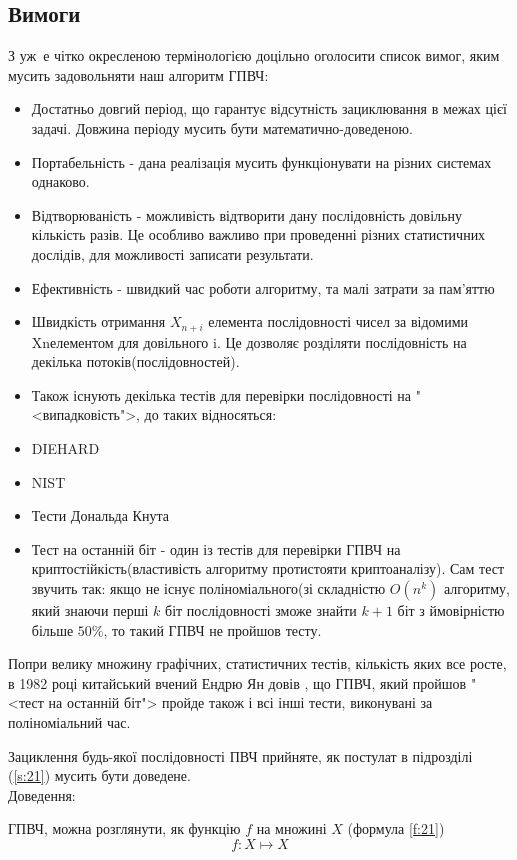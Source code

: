 \documentclass[oneside,final,14pt]{extreport}
\begin{document}
\begin{large}
\section{Вимоги}\label{s:22}
З уж~е чітко окресленою термінологією доцільно оголосити 
список вимог, яким мусить задовольняти наш алгоритм ГПВЧ:
\begin{itemize}
	\item 
Достатньо довгий період, що гарантує відсутність зациклювання 
в межах цієї задачі. Довжина періоду мусить бути математично-доведеною.
	\item 
Портабельність - дана реалізація мусить функціонувати на різних 
системах однаково.
	\item 
Відтворюваність - можливість відтворити дану послідовність 
довільну кількість разів. Це особливо важливо при проведенні 
різних статистичних дослідів, для можливості записати результати.
	\item 
Ефективність - швидкий час роботи алгоритму, та малі затрати 
за пам'яттю
	\item 
Швидкість отримання \(X_{n+i}\) елемента послідовності чисел за відомими 
Xnелементом для довільного i. Це дозволяє розділяти послідовність 
на декілька потоків(послідовностей).
	\item 
Також існують декілька тестів для перевірки послідовності на 
"<випадковість">, до таких відносяться:
	\item 
DIEHARD
	\item 
NIST
	\item 
Тести Дональда Кнута
	\item 
Тест на останній біт - один із тестів для перевірки 
ГПВЧ на криптостійкість(властивість алгоритму протистояти 
криптоаналізу). Сам тест звучить так: якщо не існує 
поліноміального(зі складністю \(O(n^k)\) алгоритму, який знаючи 
перші \(k\) біт послідовності зможе знайти \(k + 1\) біт з ймовірністю 
більше \(50\%\), то такий ГПВЧ не пройшов тесту.
\end{itemize}

Попри велику множину графічних, статистичних тестів, кількість яких
 все росте, в 1982 році китайський вчений Ендрю Ян довів \cite{b2}, що ГПВЧ, 
 який пройшов "<тест на останній біт"> пройде також і всі інші тести, 
 виконувані за поліноміальний час.

Зациклення будь-якої послідовності ПВЧ прийняте, як постулат в 
підрозділі (\ref{s:21}) мусить бути доведене.\\
Доведення:

	ГПВЧ, можна розглянути, як функцію \(f\) на множині \(X\) (формула \ref{f:21})
\begin{equation}
	f: X \mapsto X
	\label{f:21}
\end{equation}
	


\end{large}
\end{document}
